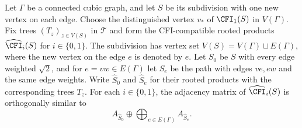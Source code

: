 \begin{lemma}\label{lem:ss-cfi-blocks}
Let $\Gamma$ be a connected cubic graph, and let $S$ be its subdivision
with one new vertex on each edge.
Choose the distinguished vertex $v_*$ of $\CFI_1(S)$ in $V(\Gamma)$.
Fix trees $(T_z)_{z\in V(S)}$ in $\mathcal T$ and form the
CFI-compatible rooted products $\widehat{\CFI}_i(S)$ for $i\in\{0,1\}$.
The subdivision has vertex set $V(S)=V(\Gamma)\sqcup E(\Gamma)$,
where the new vertex on the edge $e$ is denoted by $e$.
Let $S_0$ be $S$ with every edge weighted $\sqrt2$, and for
$e=vw\in E(\Gamma)$ let $S_e$ be the path with edges $ve,ew$ and the
same edge weights.
Write $\widehat S_0$ and $\widehat S_e$ for their rooted products with
the corresponding trees $T_z$.
For each $i\in\{0,1\}$, the adjacency matrix of $\widehat{\CFI}_i(S)$
is orthogonally similar to
\begin{equation}\label{eq:ss-rooted-blocks}
 A_{\widehat S_0}\oplus\bigoplus_{e\in E(\Gamma)}A_{\widehat S_e}.
\end{equation}

\end{lemma}
